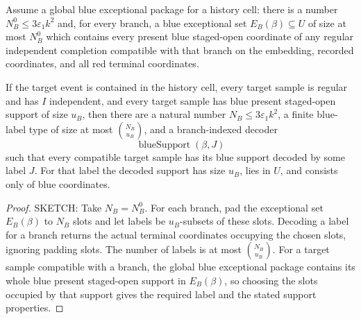 \begin{helper}
Assume a global blue exceptional package for a history cell: there is a
number \(N_B^0\le 3\varepsilon_1 k^2\) and, for every branch, a blue
exceptional set \(E_B(\beta)\subseteq U\) of size at most \(N_B^0\) which
contains every present blue staged-open coordinate of any regular independent
completion compatible with that branch on the embedding, recorded
coordinates, and all red terminal coordinates.

If the target event is contained in the history cell, every target sample is
regular and has \(I\) independent, and every target sample has blue present
staged-open support of size \(u_B\), then there are a natural number
\(N_B\le 3\varepsilon_1k^2\), a finite blue-label type of size at most
\(\binom{N_B}{u_B}\), and a branch-indexed decoder
\[
\operatorname{blueSupport}(\beta,J)
\]
such that every compatible target sample has its blue support decoded by some
label \(J\).  For that label the decoded support has size \(u_B\), lies in
\(U\), and consists only of blue coordinates.
\end{helper}
\begin{proof}
SKETCH:
Take \(N_B=N_B^0\).  For each branch, pad the exceptional set
\(E_B(\beta)\) to \(N_B\) slots and let labels be \(u_B\)-subsets of these
slots.  Decoding a label for a branch returns the actual terminal coordinates
occupying the chosen slots, ignoring padding slots.  The number of labels is
at most \(\binom{N_B}{u_B}\).  For a target sample compatible with a branch,
the global blue exceptional package contains its whole blue present
staged-open support in \(E_B(\beta)\), so choosing the slots occupied by that
support gives the required label and the stated support properties.
\end{proof}
